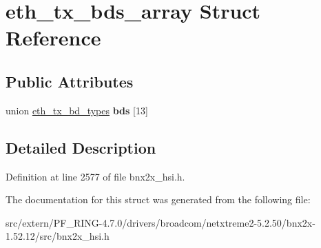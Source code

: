 \hypertarget{structeth__tx__bds__array}{
\section{eth\_\-tx\_\-bds\_\-array Struct Reference}
\label{structeth__tx__bds__array}
}
\subsection*{Public Attributes}
\begin{DoxyCompactItemize}
\item 
\hypertarget{structeth__tx__bds__array_a1e11c3fbcd58f5006034ef4efbd9bf0d}{
union \hyperlink{unioneth__tx__bd__types}{eth\_\-tx\_\-bd\_\-types} {\bfseries bds} \mbox{[}13\mbox{]}}
\label{structeth__tx__bds__array_a1e11c3fbcd58f5006034ef4efbd9bf0d}

\end{DoxyCompactItemize}


\subsection{Detailed Description}


Definition at line 2577 of file bnx2x\_\-hsi.h.



The documentation for this struct was generated from the following file:\begin{DoxyCompactItemize}
\item 
src/extern/PF\_\-RING-\/4.7.0/drivers/broadcom/netxtreme2-\/5.2.50/bnx2x-\/1.52.12/src/bnx2x\_\-hsi.h\end{DoxyCompactItemize}
